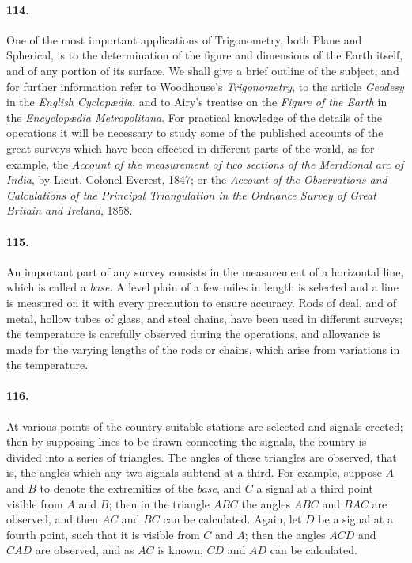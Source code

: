 \documentclass{book}[2004/02/16]
\begin{document}
\begin{mainmatter}
\begin{spacing}{1.3}
\paragraph{114.} One of the most important applications of Trigonometry,
both Plane and Spherical, is to the determination of the
figure and dimensions of the Earth itself, and of any portion of its
surface. We shall give a brief outline of the subject, and for
further information refer to Woodhouse's \textit{Trigonometry}, to the
article \textit{Geodesy} in the \textit{English Cyclop\ae dia}, and to Airy's treatise
on the \textit{Figure of the Earth} in the \textit{Encyclop\ae dia Metropolitana}.
For practical knowledge of the details of the operations it will
be necessary to study some of the published accounts of the great
surveys which have been effected in different parts of the world,
as for example, the \textit{Account of the measurement of two sections of
the Meridional arc of India}, by Lieut.-Colonel Everest, 1847; or
the \textit{Account of the Observations and Calculations of the Principal
Triangulation in the Ordnance Survey of Great Britain
and Ireland}, 1858.

\paragraph{115.} An important part of any survey consists in the measurement
of a horizontal line, which is called a \textit{base}. A level plain
of a few miles in length is selected and a line is measured on it with
every precaution to ensure accuracy. Rods of deal, and of metal,
hollow tubes of glass, and steel chains, have been used in different
surveys; the temperature is carefully observed during the operations,
and allowance is made for the varying lengths of the rods
or chains, which arise from variations in the temperature.

\paragraph{116.} At various points of the country suitable stations are
selected and signals erected; then by supposing lines to be drawn
connecting the signals, the country is divided into a series of
triangles. The angles of these triangles are observed, that is, the
angles which any two signals subtend at a third. For example,
suppose $A$ and $B$ to denote the extremities of the \textit{base}, and $C$ a
signal at a third point visible from $A$ and $B$; then in the triangle
$ABC$ the angles $ABC$ and $BAC$ are observed, and then $AC$ and $BC$
can be calculated. Again, let $D$ be a signal at a fourth point,
such that it is visible from $C$ and $A$; then the angles $ACD$ and
$CAD$ are observed, and as $AC$ is known, $CD$ and $AD$ can be
calculated.


\end{spacing}
\end{mainmatter}
\end{document}
